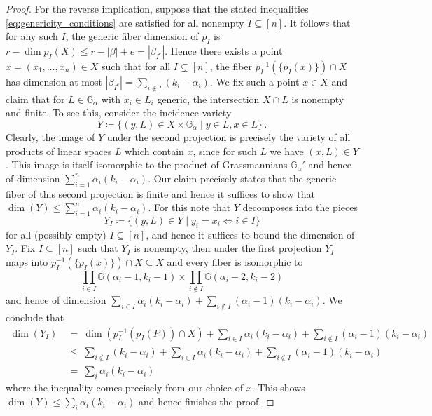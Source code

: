 \documentclass[12pt]{article}
\theoremstyle{definition}
\newcommand{\G}{{\mathbb G}}
\begin{document}
\begin{proof}
\medskip

For the reverse implication, suppose that the stated inequalities \eqref{eq:genericity_conditions} are satisfied for all nonempty $I\subseteq [n]$. It follows that for any such $I$, the generic fiber dimension of $p_I$ is $r-\dim p_I(X)\leq r-|\beta|+e=|\beta_{I^c}|$. Hence there exists a point $x=(x_1,\dots,x_n) \in X$ such that for all $I\subsetneq[n]$, the fiber $p_I^{-1}(\{p_I(x)\})\cap X$ has dimension at most $|\beta_{I^c}|=\sum_{i \not \in I} (k_i-\alpha_i)$. We fix such a point $x\in X$ and claim that for $L\in \G_\alpha$ with $x_i \in L_i$ generic, the intersection $X \cap L$ is nonempty and finite. To see this, consider the incidence variety
\[
    Y \coloneqq \{(y,L)\in X\times \G_\alpha\mid y\in L, x\in L\}\,.
\]
Clearly, the image of $Y$ under the second projection is precisely the variety of all products of linear spaces $L$ which contain $x$, since for such $L$ we have $(x,L)\in Y$. This image is itself isomorphic to the product of Grassmannians $\G_\alpha'$ and hence of dimension $\sum_{i=1}^n \alpha_i(k_i-\alpha_i)$.  Our claim precisely states that the generic fiber of this second projection is finite and hence it suffices to show that $\dim(Y)\leq \sum_{i=1}^n \alpha_i(k_i-\alpha_i)$. For this note that $Y$ decomposes into the pieces
\[
    Y_I\coloneqq \{(y,L)\in Y\mid y_i=x_i \Leftrightarrow i\in I\}
\]
for all (possibly empty) $I\subseteq [n]$, and hence it suffices to bound the dimension of $Y_I$. Fix $I\subseteq [n]$ such that $Y_I$ is nonempty, then under the first projection $Y_I$ maps into $p_I^{-1}(\{p_I(x)\}) \cap X \subseteq X$ and every fiber is isomorphic to 
\[
    \prod_{i\in I}\G(\alpha_i-1,k_i-1)\times \prod_{i\notin I}\G(\alpha_i-2,k_i-2)
\]
and hence of dimension $\sum_{i \in I} \alpha_i(k_i-\alpha_i)+\sum_{i \not \in I} (\alpha_i-1)(k_i-\alpha_i)$.
We conclude that
\begin{align*}
    \dim(Y_I)\ &=\ \dim(p_I^{-1}(p_I(P)) \cap X) 
    +\sum_{i \in I} \alpha_i(k_i-\alpha_i)+\sum_{i \not \in I} (\alpha_i-1)(k_i-\alpha_i)\\
    &\leq\ \sum_{i \not \in I}(k_i-\alpha_i)+\sum_{i \in I} \alpha_i(k_i-\alpha_i)+\sum_{i \not \in I} (\alpha_i-1)(k_i-\alpha_i)\\
    &=\ \sum_i \alpha_i(k_i-\alpha_i)
\end{align*}
where the inequality comes precisely from our choice of $x$. This shows $\dim(Y)\leq \sum_i \alpha_i(k_i-\alpha_i)$ and hence finishes the proof.
\end{proof}
\end{document}
